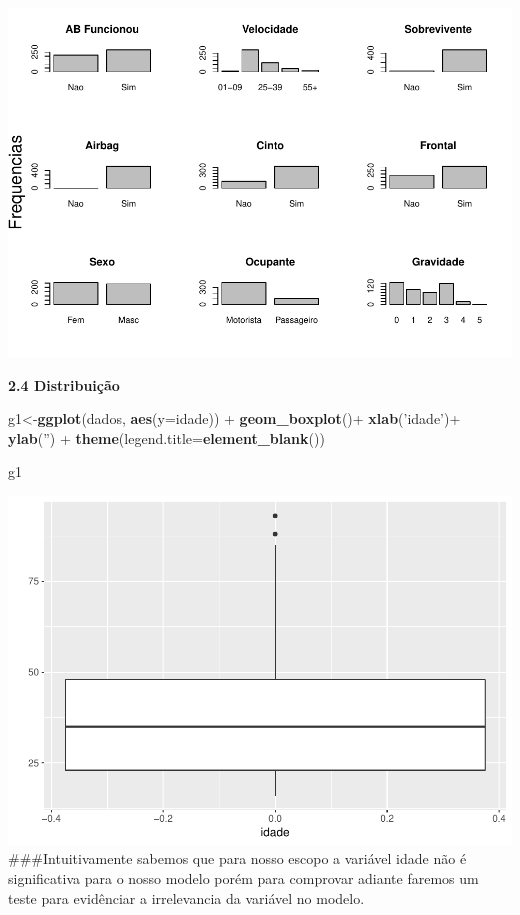 \documentclass[]{article}
\newenvironment{Shaded}{\begin{snugshade}}{\end{snugshade}}
\newcommand{\KeywordTok}[1]{\textcolor[rgb]{0.13,0.29,0.53}{\textbf{{#1}}}}
\newcommand{\DataTypeTok}[1]{\textcolor[rgb]{0.13,0.29,0.53}{{#1}}}
\newcommand{\StringTok}[1]{\textcolor[rgb]{0.31,0.60,0.02}{{#1}}}
\newcommand{\NormalTok}[1]{{#1}}
\begin{document}
\includegraphics{Dados_Binários1_files/figure-latex/unnamed-chunk-5-1.pdf}

\textbf{2.4 Distribuição}

\begin{Shaded}
\begin{Highlighting}[]
\NormalTok{g1<-}\KeywordTok{ggplot}\NormalTok{(dados, }\KeywordTok{aes}\NormalTok{(}\DataTypeTok{y=}\NormalTok{idade)) +}\StringTok{ }
\StringTok{  }\KeywordTok{geom_boxplot}\NormalTok{()+}\StringTok{ }\KeywordTok{xlab}\NormalTok{(}\StringTok{'idade'}\NormalTok{)+}\StringTok{ }\KeywordTok{ylab}\NormalTok{(}\StringTok{''}\NormalTok{) +}
\StringTok{  }\KeywordTok{theme}\NormalTok{(}\DataTypeTok{legend.title=}\KeywordTok{element_blank}\NormalTok{())}


\NormalTok{g1}
\end{Highlighting}
\end{Shaded}

\includegraphics{Dados_Binários1_files/figure-latex/unnamed-chunk-6-1.pdf}
\#\#\#Intuitivamente sabemos que para nosso escopo a variável idade não
é significativa para o nosso modelo porém para comprovar adiante faremos
um teste para evidênciar a irrelevancia da variável no modelo.
\end{document}
